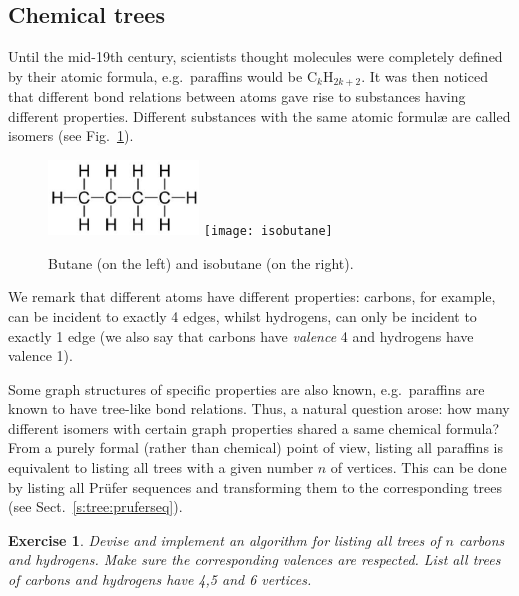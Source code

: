 \documentclass[a4paper]{book}
\theoremstyle{changebreak}                %
\newtheorem{ex}[result]{Exercise}
\begin{document}
\subsection{Chemical trees}
Until the mid-19th century, scientists thought
molecules were completely defined by their atomic
formula, e.g.~paraffins would be
$\mbox{C}_k\mbox{H}_{2k+2}$. It was then noticed that different
bond relations between atoms gave rise to
substances having different properties. Different substances with the
same atomic formul{\ae} are called isomers (see
Fig.~\ref{f:isomer}).
\begin{figure}[!ht]
\begin{center}
\includegraphics[width=4cm]{butane}\hspace*{1cm}
\texttt{[image: isobutane]}
\end{center}
\caption{Butane (on the left) and isobutane (on the right).}
\label{f:isomer}
\end{figure}
We remark that different atoms have different properties:
carbons, for example, can be incident to exactly 4
edges, whilst hydrogens, can only be incident to
exactly 1 edge (we also say that carbons have {\it
  valence} 4 and hydrogens have valence 1).

Some graph structures of specific properties are also known,
e.g.~paraffins are known to have tree-like bond
relations. Thus, a natural question arose: how many different isomers
with certain graph properties shared a same chemical
formula? From a purely formal (rather than
chemical) point of view, listing all paraffins is equivalent to
listing all trees with a given number $n$ of
vertices. This can be done by listing all Pr\"ufer
sequences and transforming them to the corresponding trees (see
Sect.~\ref{s:tree:pruferseq}).

\begin{ex}
Devise and implement an algorithm for listing all trees of $n$ carbons
and hydrogens. Make sure the corresponding valences are
respected. List all trees of carbons and hydrogens have 4,5 and 6
vertices.
\end{ex}
\end{document}
